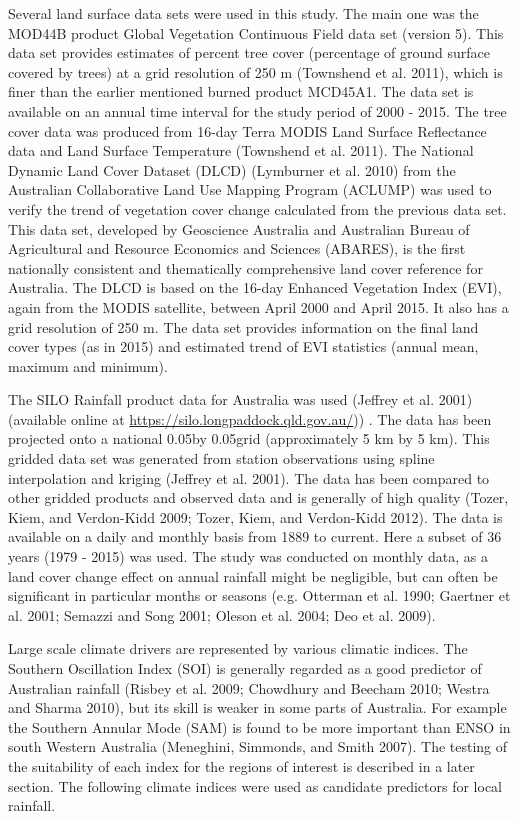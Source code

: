 \documentclass[fleqn,10pt,lineno]{wlpeerj} %
\begin{document}
Several land surface data sets were used in this study. The main one was
the MOD44B product Global Vegetation Continuous Field data set (version
5). This data set provides estimates of percent tree cover (percentage
of ground surface covered by trees) at a grid resolution of 250 m
(Townshend et al. 2011), which is finer than the earlier mentioned
burned product MCD45A1. The data set is available on an annual time
interval for the study period of 2000 - 2015. The tree cover data was
produced from 16-day Terra MODIS Land Surface Reflectance data and Land
Surface Temperature (Townshend et al. 2011). The National Dynamic Land
Cover Dataset (DLCD) (Lymburner et al. 2010) from the Australian
Collaborative Land Use Mapping Program (ACLUMP) was used to verify the
trend of vegetation cover change calculated from the previous data set.
This data set, developed by Geoscience Australia and Australian Bureau
of Agricultural and Resource Economics and Sciences (ABARES), is the
first nationally consistent and thematically comprehensive land cover
reference for Australia. The DLCD is based on the 16-day Enhanced
Vegetation Index (EVI), again from the MODIS satellite, between April
2000 and April 2015. It also has a grid resolution of 250 m. The data
set provides information on the final land cover types (as in 2015) and
estimated trend of EVI statistics (annual mean, maximum and minimum).

The SILO Rainfall product data for Australia was used (Jeffrey et al.
2001) (available online at \url{https://silo.longpaddock.qld.gov.au/}))
. The data has been projected onto a national 0.05\textdegree  by
0.05\textdegree  grid (approximately 5 km by 5 km). This gridded data
set was generated from station observations using spline interpolation
and kriging (Jeffrey et al. 2001). The data has been compared to other
gridded products and observed data and is generally of high quality
(Tozer, Kiem, and Verdon-Kidd 2009; Tozer, Kiem, and Verdon-Kidd 2012).
The data is available on a daily and monthly basis from 1889 to current.
Here a subset of 36 years (1979 - 2015) was used. The study was
conducted on monthly data, as a land cover change effect on annual
rainfall might be negligible, but can often be significant in particular
months or seasons (e.g. Otterman et al. 1990; Gaertner et al. 2001;
Semazzi and Song 2001; Oleson et al. 2004; Deo et al. 2009).

Large scale climate drivers are represented by various climatic indices.
The Southern Oscillation Index (SOI) is generally regarded as a good
predictor of Australian rainfall (Risbey et al. 2009; Chowdhury and
Beecham 2010; Westra and Sharma 2010), but its skill is weaker in some
parts of Australia. For example the Southern Annular Mode (SAM) is found
to be more important than ENSO in south Western Australia (Meneghini,
Simmonds, and Smith 2007). The testing of the suitability of each index
for the regions of interest is described in a later section. The
following climate indices were used as candidate predictors for local
rainfall.
\end{document}
